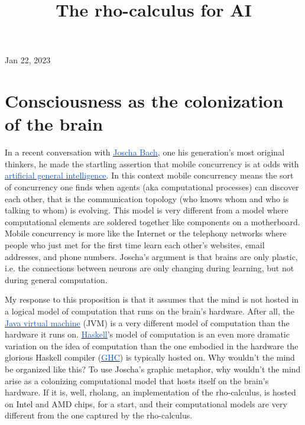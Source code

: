 \documentclass[runningheads]{llncs}
\title{The rho-calculus for AI}
\date{}
\author{}
\begin{document}
\maketitle


\begin{center}
Jan 22, 2023
\end{center}


\vspace{1\baselineskip}
\section{Consciousness as the colonization of the brain}

In a recent conversation with \href{https://en.wikipedia.org/wiki/Joscha_Bach}{\uline{\textcolor[HTML]{1155CC}{Joscha Bach}}}, one his generation’s most original thinkers, he made the startling assertion that mobile concurrency is at odds with \href{https://en.wikipedia.org/wiki/Artificial_general_intelligence}{\uline{\textcolor[HTML]{1155CC}{artificial general intelligence}}}. In this context mobile concurrency means the sort of concurrency one finds when agents (aka computational processes) can discover each other, that is the communication topology (who knows whom and who is talking to whom) is evolving. This model is very different from a model where computational elements are soldered together like components on a motherboard. Mobile concurrency is more like the Internet or the telephony networks where people who just met for the first time learn each other’s websites, email addresses, and phone numbers. Joscha’s argument is that brains are only plastic, i.e. the connections between neurons are only changing during learning, but not during general computation.

\vspace{1\baselineskip}
My response to this proposition is that it assumes that the mind is not hosted in a logical model of computation that runs on the brain’s hardware. After all, the \href{https://en.wikipedia.org/wiki/Java_virtual_machine}{\uline{\textcolor[HTML]{1155CC}{Java virtual machine}}} (JVM) is a very different model of computation than the hardware it runs on. \href{https://en.wikipedia.org/wiki/Haskell}{\uline{\textcolor[HTML]{1155CC}{Haskell}}}’s model of computation is an even more dramatic variation on the idea of computation than the one embodied in the hardware the glorious Haskell compiler (\href{https://en.wikipedia.org/wiki/GHC}{\uline{\textcolor[HTML]{1155CC}{GHC}}}) is typically hosted on. Why wouldn’t the mind be organized like this? To use Joscha’s graphic metaphor, why wouldn’t the mind arise as a colonizing computational model that hosts itself on the brain’s hardware. If it is, well, rholang, an implementation of the rho-calculus, is hosted on Intel and AMD chips, for a start, and their computational models are very different from the one captured by the rho-calculus. 
\end{document}
